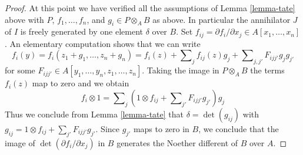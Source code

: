 \documentclass[10pt,a4paper]{amsart}
\theoremstyle{plain}
\theoremstyle{definition}
\theoremstyle{remark}
\numberwithin{equation}{subsection}
\begin{document}
\begin{proof}
\medskip\noindent
At this point we have verified all the assumptions of Lemma \ref{lemma-tate}
above with $P$, $f_1, \ldots, f_n$, and $g_i \in P \otimes_A B$ as above.
In particular the annihilator $J$ of $I$ is freely generated by one
element $\delta$ over $B$.
Set $f_{ij} = \partial f_i/\partial x_j \in A[x_1, \ldots, x_n]$.
An elementary computation shows that we can write
$$
f_i(y) =
f_i(z_1 + g_1, \ldots, z_n + g_n) =
f_i(z) + \sum\nolimits_j f_{ij}(z) g_j +
\sum\nolimits_{j, j'} F_{ijj'}g_jg_{j'}
$$
for some $F_{ijj'} \in A[y_1, \ldots, y_n, z_1, \ldots, z_n]$.
Taking the image in $P \otimes_A B$ the terms $f_i(z)$ map to
zero and we obtain
$$
f_i \otimes 1 = \sum\nolimits_j
\left(1 \otimes f_{ij} + \sum\nolimits_{j'} F_{ijj'}g_{j'}\right)g_j
$$
Thus we conclude from Lemma \ref{lemma-tate}
that $\delta = \det(g_{ij})$ with
$g_{ij} = 1 \otimes f_{ij} + \sum_{j'} F_{ijj'}g_{j'}$.
Since $g_{j'}$ maps to zero in $B$, we conclude
that the image of $\det(\partial f_i/\partial x_j)$ in $B$
generates the Noether different of $B$ over $A$.
\end{proof}
\end{document}

